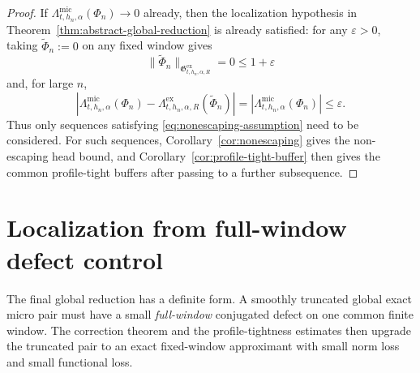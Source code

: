 \documentclass[11pt,a4paper]{amsart}
\theoremstyle{plain}
\theoremstyle{definition}
\theoremstyle{remark}
\begin{document}
\begin{proof}
If \(\Lambda_{t,h_n,\alpha}^{\mathrm{mic}}(\Phi_n)\to0\) already, then the localization hypothesis in
Theorem~\ref{thm:abstract-global-reduction} is already satisfied: for any \(\varepsilon>0\), taking
\(\widetilde\Phi_n:=0\) on any fixed window gives
\[
\|\widetilde\Phi_n\|_{\mathfrak G_{t,h_n,\alpha,R}^{\mathrm{ex}}}=0\le1+\varepsilon
\]
and, for large \(n\),
\[
\left|
\Lambda_{t,h_n,\alpha}^{\mathrm{mic}}(\Phi_n)
-
\Lambda_{t,h_n,\alpha,R}^{\mathrm{ex}}(\widetilde\Phi_n)
\right|
=
\left|
\Lambda_{t,h_n,\alpha}^{\mathrm{mic}}(\Phi_n)
\right|
\le
\varepsilon.
\]
Thus only sequences satisfying \eqref{eq:nonescaping-assumption} need to be considered. For such
sequences, Corollary~\ref{cor:nonescaping} gives the non-escaping head bound, and
Corollary~\ref{cor:profile-tight-buffer} then gives the common profile-tight buffers after
passing to a further subsequence.
\end{proof}

\section{Localization from full-window defect control}
\label{sec:defect-localization}

The final global reduction has a definite form.  A smoothly truncated global exact micro pair must
have a small \emph{full-window} conjugated defect on one common finite window.  The correction
theorem and the profile-tightness estimates then upgrade the truncated pair to an exact fixed-window
approximant with small norm loss and small functional loss.
\end{document}
